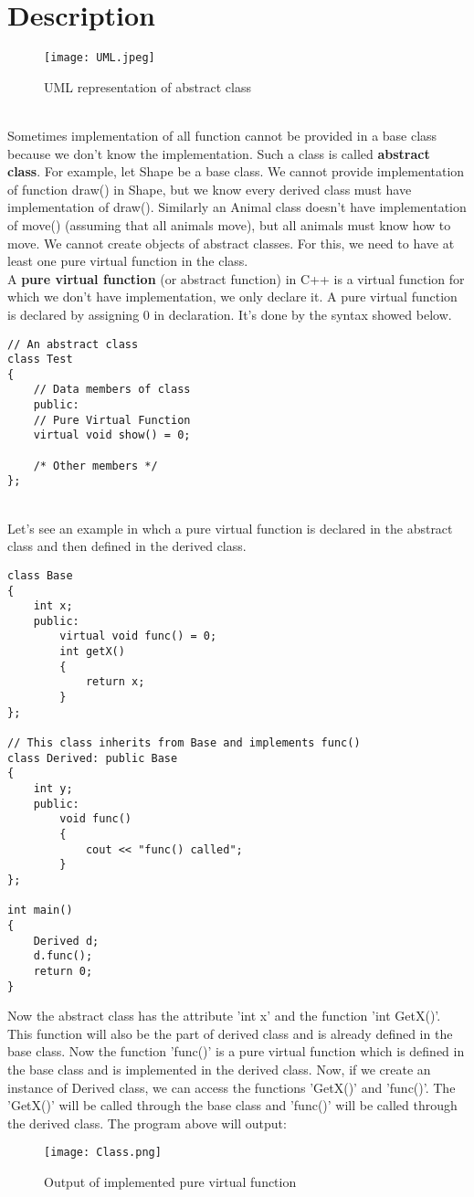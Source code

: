 \documentclass[11pt,fleqn]{book} %
\begin{document}
\section{Description}
\begin{figure}[h]
	\centering
	\texttt{[image: UML.jpeg]}
	\caption{UML representation of abstract class}
\end{figure} ~\\
Sometimes implementation of all function cannot be provided in a base class because we don’t know the implementation. Such a class is called \textbf{abstract class}. For example, let Shape be a base class. We cannot provide implementation of function draw() in Shape, but we know every derived class must have implementation of draw(). Similarly an Animal class doesn’t have implementation of move() (assuming that all animals move), but all animals must know how to move. We cannot create objects of abstract classes. For this, we need to have at least one pure virtual function in the class. \\
A \textbf{pure virtual function} (or abstract function) in C++ is a virtual function for which we don’t have implementation, we only declare it. A pure virtual function is declared by assigning 0 in declaration. It's done by the syntax showed below.
\begin{lstlisting}
// An abstract class
class Test
{   
	// Data members of class
	public:
	// Pure Virtual Function
	virtual void show() = 0;

	/* Other members */
};
\end{lstlisting} ~\\
Let's see an example in whch a pure virtual function is declared in the abstract class and then defined in the derived class.
\begin{example}
\begin{lstlisting}
class Base
{
	int x;
	public:
		virtual void func() = 0;
		int getX() 
		{
			return x; 
		}
};

// This class inherits from Base and implements func()
class Derived: public Base
{
	int y;
	public:
		void func()
		{
			cout << "func() called";
		}
};

int main()
{
	Derived d;
	d.func();
	return 0;
}
\end{lstlisting}
Now the abstract class has the attribute 'int x' and the function 'int GetX()'. This function will also be the part of derived class and is already defined in the base class. Now the function 'func()' is a pure virtual function which is defined in the base class and is implemented in the derived class. Now, if we create an instance of Derived class, we can access the functions 'GetX()' and 'func()'. The 'GetX()' will be called through the base class and 'func()' will be called through the derived class.
The program above will output:
\begin{figure}[h]
	\centering
	\texttt{[image: Class.png]}
	\caption{Output of implemented pure virtual function}
\end{figure}
\end{example}
\end{document}
